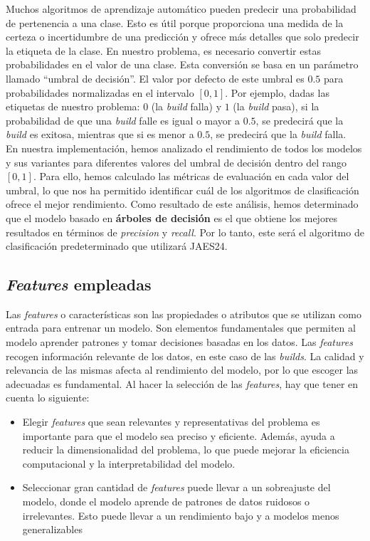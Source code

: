 Muchos algoritmos de aprendizaje automático pueden predecir una probabilidad de
pertenencia a una clase. Esto es útil porque proporciona una medida de la certeza o incertidumbre
de una predicción y ofrece más detalles que solo predecir la etiqueta de la clase. En nuestro
problema, es necesario convertir estas probabilidades en el valor de una clase. Esta conversión
se basa en un parámetro llamado ``umbral de decisión''. El valor por defecto de este umbral
es $0.5$ para probabilidades normalizadas en el intervalo $[0, 1]$. Por ejemplo, dadas las
etiquetas de nuestro problema: $0$ (la \textit{build} falla) y $1$ (la \textit{build} pasa), si
la probabilidad de que una \textit{build} falle es igual o mayor a $0.5$, se predecirá que la
\textit{build} es exitosa, mientras que si es menor a $0.5$, se predecirá que la \textit{build}
falla.\\

En nuestra implementación, hemos analizado el rendimiento de todos los modelos y sus variantes
para diferentes valores del umbral de decisión dentro del rango $[0, 1]$. Para ello, hemos
calculado las métricas de evaluación en cada valor del umbral, lo que nos ha permitido identificar
cuál de los algoritmos de clasificación ofrece el mejor rendimiento. Como resultado de este
análisis, hemos determinado que el modelo basado en \textbf{árboles de decisión} es el que obtiene los
mejores resultados en términos de \textit{precision} y \textit{recall}. Por lo tanto, este será
el algoritmo de clasificación predeterminado que utilizará JAES24.


\subsection{\textit{Features} empleadas}\label{sec:features_used}
Las \textit{features} o características son las propiedades o atributos que se utilizan como entrada
para entrenar un modelo. Son elementos fundamentales que permiten al modelo aprender patrones y
tomar decisiones basadas en los datos. Las \textit{features} recogen información relevante de
los datos, en este caso de las \textit{builds}. La calidad y relevancia de las mismas afecta
al rendimiento del modelo, por lo que escoger las adecuadas es fundamental. Al hacer la selección
de las \textit{features}, hay que tener en cuenta lo siguiente:

\begin{itemize}
    \item Elegir \textit{features} que sean relevantes y representativas del problema es importante
    para que el modelo sea preciso y eficiente. Además, ayuda a reducir la dimensionalidad
    del problema, lo que puede mejorar la eficiencia computacional y la interpretabilidad del
    modelo.\\
    \item Seleccionar gran cantidad de \textit{features} puede llevar a un sobreajuste del modelo,
    donde el modelo aprende de patrones de datos ruidosos o irrelevantes. Esto puede llevar a un
    rendimiento bajo y a modelos menos generalizables
\end{itemize}

